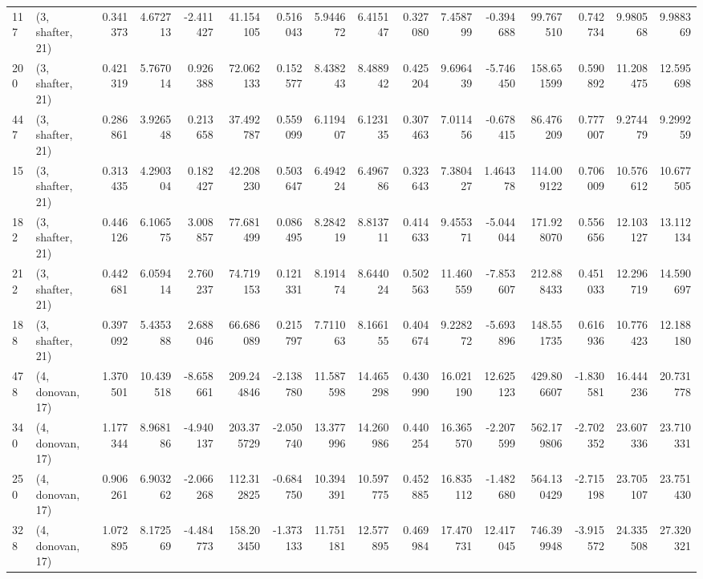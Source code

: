 \begin{tabular}{llrrrrrrrrrrrrrr}
117 &  (3, shafter, 21) &   0.341373 &   4.672713 &  -2.411427 &    41.154105 &   0.516043 &   5.944672 &   6.415147 &  0.327080 &   7.458799 &  -0.394688 &    99.767510 &   0.742734 &   9.980568 &   9.988369 \\
200 &  (3, shafter, 21) &   0.421319 &   5.767014 &   0.926388 &    72.062133 &   0.152577 &   8.438243 &   8.488942 &  0.425204 &   9.696439 &  -5.746450 &   158.651599 &   0.590892 &  11.208475 &  12.595698 \\
447 &  (3, shafter, 21) &   0.286861 &   3.926548 &   0.213658 &    37.492787 &   0.559099 &   6.119407 &   6.123135 &  0.307463 &   7.011456 &  -0.678415 &    86.476209 &   0.777007 &   9.274479 &   9.299259 \\
15  &  (3, shafter, 21) &   0.313435 &   4.290304 &   0.182427 &    42.208230 &   0.503647 &   6.494224 &   6.496786 &  0.323643 &   7.380427 &   1.464378 &   114.009122 &   0.706009 &  10.576612 &  10.677505 \\
182 &  (3, shafter, 21) &   0.446126 &   6.106575 &   3.008857 &    77.681499 &   0.086495 &   8.284219 &   8.813711 &  0.414633 &   9.455371 &  -5.044044 &   171.928070 &   0.556656 &  12.103127 &  13.112134 \\
212 &  (3, shafter, 21) &   0.442681 &   6.059414 &   2.760237 &    74.719153 &   0.121331 &   8.191474 &   8.644024 &  0.502563 &  11.460559 &  -7.853607 &   212.888433 &   0.451033 &  12.296719 &  14.590697 \\
188 &  (3, shafter, 21) &   0.397092 &   5.435388 &   2.688046 &    66.686089 &   0.215797 &   7.711063 &   8.166155 &  0.404674 &   9.228272 &  -5.693896 &   148.551735 &   0.616936 &  10.776423 &  12.188180 \\
478 &  (4, donovan, 17) &   1.370501 &  10.439518 &  -8.658661 &   209.244846 &  -2.138780 &  11.587598 &  14.465298 &  0.430990 &  16.021190 &  12.625123 &   429.806607 &  -1.830581 &  16.444236 &  20.731778 \\
340 &  (4, donovan, 17) &   1.177344 &   8.968186 &  -4.940137 &   203.375729 &  -2.050740 &  13.377996 &  14.260986 &  0.440254 &  16.365570 &  -2.207599 &   562.179806 &  -2.702352 &  23.607336 &  23.710331 \\
250 &  (4, donovan, 17) &   0.906261 &   6.903262 &  -2.066268 &   112.312825 &  -0.684750 &  10.394391 &  10.597775 &  0.452885 &  16.835112 &  -1.482680 &   564.130429 &  -2.715198 &  23.705107 &  23.751430 \\
328 &  (4, donovan, 17) &   1.072895 &   8.172569 &  -4.484773 &   158.203450 &  -1.373133 &  11.751181 &  12.577895 &  0.469984 &  17.470731 &  12.417045 &   746.399948 &  -3.915572 &  24.335508 &  27.320321 \\

\end{tabular}
